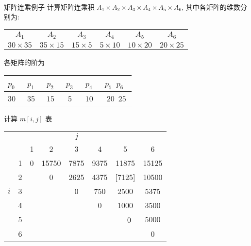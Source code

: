 \documentclass[fontset=fandol,UTF8,fleqn]{beamer}
\begin{document}
\begin{frame}{矩阵连乘例子}
计算矩阵连乘积 $A_1\times A_2\times A_3\times A_4\times A_5\times A_6$, 其中各矩阵的维数分别为: 

\begin{table}
  \centering
  \begin{tabular}{cccccc}
\hline
    $A_1$ & $A_2$ &     $A_3$ &     $A_4$ &     $A_5$ &     $A_6$ \\
\hline
$30\times 35$ & $35\times 15$ & $15\times 5$ & $5\times 10$ & $10\times 20$ & $20\times 25$    \\
\hline
  \end{tabular}
\end{table}
各矩阵的阶为 
\begin{table}
  \centering
  \begin{tabular}{cccccc}
\hline
   $p_0$\qquad\ &  $p_1$\qquad\  & $p_2$\qquad\  &     $p_3$\qquad\  &
   $p_4$\qquad\  &     $p_5$\qquad\  $p_6$\   \\
\hline
$30$\qquad\  & $35$\qquad\  & $15$\qquad\  & $5$\qquad\  & $10$\qquad\  & $20$\qquad\ $25$     \\
\hline
  \end{tabular}
\end{table}
\end{frame}

\begin{frame}{计算 $m[i,j]$ 表}
\begin{table}
  \centering
\large{
  \begin{tabular}{lccccccc}
& & & & $j$ & & & \\    
&  & 1 & 2 & 3 & 4 & 5 & 6\\
\hline
& 1 & 0 & 15750 & 7875 & 9375 & 11875  & 15125\\
& 2 & & 0 & 2625 & 4375 & [7125] & 10500\\
$i$ & 3 & & & 0 & 750 & 2500 & 5375\\
& 4 & & & & 0 & 1000 & 3500 \\
& 5 &  &  & & &　0 & 5000\\
& 6 & &　& & & & 0\\
\hline
  \end{tabular}
}
\end{table}
\end{frame}
\end{document}
